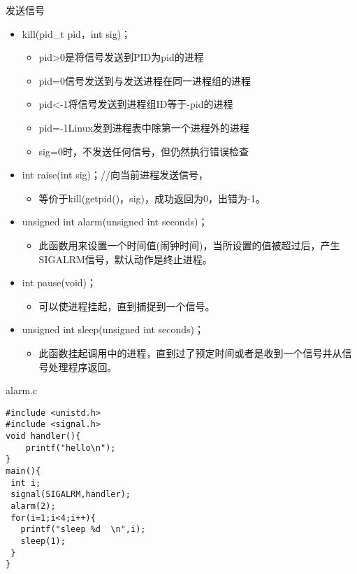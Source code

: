 \begin{frame}{发送信号}
\begin{itemize}
\item kill(pid\_t pid，int sig)；
\begin{itemize}
\item pid>0是将信号发送到PID为pid的进程
\item pid=0信号发送到与发送进程在同一进程组的进程
\item pid<-1将信号发送到进程组ID等于-pid的进程
\item pid=-1Linux发到进程表中除第一个进程外的进程
\item sig=0时，不发送任何信号，但仍然执行错误检查
\end{itemize}
\item int raise(int sig)；//向当前进程发送信号，
\begin{itemize}
\item 等价于kill(getpid()，sig)，成功返回为0，出错为-1。
\end{itemize}
\item unsigned int alarm(unsigned int seconds)；
\begin{itemize}
\item 此函数用来设置一个时间值(闹钟时间)，当所设置的值被超过后，产生SIGALRM信号，默认动作是终止进程。
\end{itemize}
\item int pause(void)；
\begin{itemize}
\item 可以使进程挂起，直到捕捉到一个信号。
\end{itemize}
\item unsigned int sleep(unsigned int seconds)；
\begin{itemize}
\item 此函数挂起调用中的进程，直到过了预定时间或者是收到一个信号并从信号处理程序返回。 
\end{itemize}
\end{itemize}
\end{frame}


\def\lstlistingname{例}
\begin{frame}[containsverbatim]{alarm.c}
\begin{lstlisting}
#include <unistd.h>
#include <signal.h>
void handler(){
	printf("hello\n");
}
main(){
 int i;
 signal(SIGALRM,handler);
 alarm(2);
 for(i=1;i<4;i++){
   printf("sleep %d  \n",i);
   sleep(1);
 }
}
\end{lstlisting}
\end{frame}



